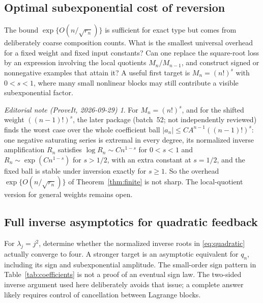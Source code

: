 \documentclass[11pt,a4paper]{article}
\numberwithin{equation}{section}
\theoremstyle{definition}
\theoremstyle{remark}
\newtheorem*{ednote}{Editorial note (ProveIt, 2026-09-29)}
\begin{document}
\subsection{Optimal subexponential cost of reversion}

The bound $\exp\{O(n/\sqrt{r_n})\}$ is sufficient for exact type but
comes from deliberately coarse composition counts. What is the smallest
universal overhead for a fixed weight and fixed input constants? Can
one replace the square-root loss by an expression involving the local
quotients $M_n/M_{n-1}$, and construct signed or nonnegative examples
that attain it? A useful first target is $M_n=(n!)^s$ with $0<s<1$,
where many small nonlinear blocks may still contribute a visible
subexponential factor.
\begin{ednote}
For $M_n=(n!)^s$, and for the shifted weight $((n-1)!)^s$, the later package
\cite{ed:ssc} (batch~52; not independently reviewed) finds the worst case
over the whole coefficient ball $|a_n|\le CA^{n-1}((n-1)!)^s$: one negative
saturating series is extremal in every degree, its normalized inverse
amplification $R_n$ satisfies $\log R_n\sim Cn^{1-s}$ for $0<s<1$ and
$R_n\sim\exp(Cn^{1-s})$ for $s>1/2$, with an extra constant at $s=1/2$, and
the fixed ball is stable under inversion exactly for $s\ge1$. So the
overhead $\exp\{O(n/\sqrt{r_n})\}$ of Theorem~\ref{thm:finite} is not sharp.
The local-quotient version for general weights remains open.
\end{ednote}

\subsection{Full inverse asymptotics for quadratic feedback}

For $\lambda_j=j^2$, determine whether the normalized inverse roots in
\eqref{eq:quadratic} actually converge to four. A stronger target is
an asymptotic equivalent for $q_n$, including its sign and
subexponential amplitude. The small-order sign pattern in
Table~\ref{tab:coefficients} is not a proof of an eventual sign law.
The two-sided inverse argument used here deliberately avoids that issue;
a complete answer likely requires control of cancellation between
Lagrange blocks.
\end{document}
